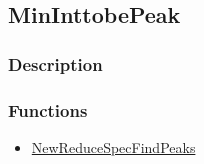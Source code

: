\subsection{MinInttobePeak}\label{MinInttobePeak}
\subsubsection{Description}

\subsubsection{Functions}
\begin{itemize}
\item \hyperref[NewReduceSpecFindPeaks]{NewReduceSpecFindPeaks}
\end{itemize}

